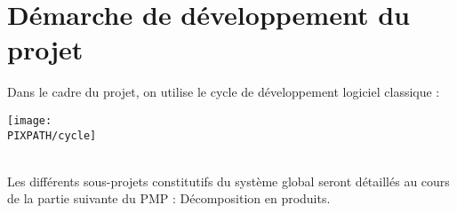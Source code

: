\section{Démarche de développement du projet}

Dans le cadre du projet, on utilise le cycle de développement logiciel
classique :

\begin{center}
\texttt{[image: \\PIXPATH/cycle]}
\end{center}

\hfill\\

Les différents sous-projets constitutifs du système global seront détaillés
au cours de la partie suivante du PMP : Décomposition en produits.

